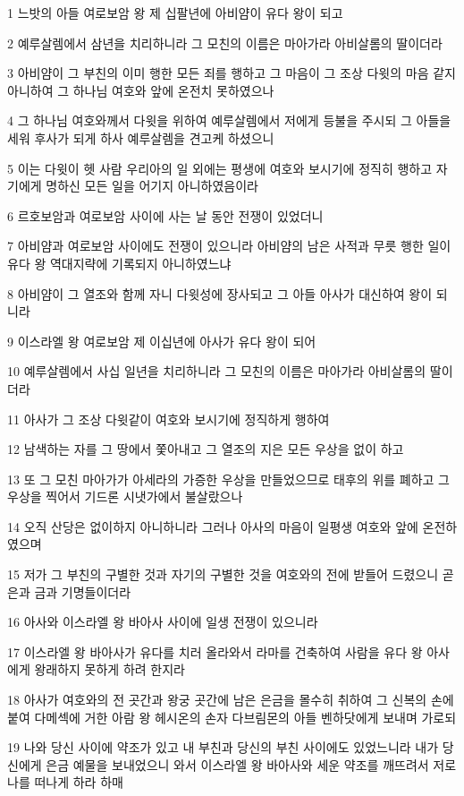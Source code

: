 \par 1 느밧의 아들 여로보암 왕 제 십팔년에 아비얌이 유다 왕이 되고
\par 2 예루살렘에서 삼년을 치리하니라 그 모친의 이름은 마아가라 아비살롬의 딸이더라
\par 3 아비얌이 그 부친의 이미 행한 모든 죄를 행하고 그 마음이 그 조상 다윗의 마음 같지 아니하여 그 하나님 여호와 앞에 온전치 못하였으나
\par 4 그 하나님 여호와께서 다윗을 위하여 예루살렘에서 저에게 등불을 주시되 그 아들을 세워 후사가 되게 하사 예루살렘을 견고케 하셨으니
\par 5 이는 다윗이 헷 사람 우리아의 일 외에는 평생에 여호와 보시기에 정직히 행하고 자기에게 명하신 모든 일을 어기지 아니하였음이라
\par 6 르호보암과 여로보암 사이에 사는 날 동안 전쟁이 있었더니
\par 7 아비얌과 여로보암 사이에도 전쟁이 있으니라 아비얌의 남은 사적과 무릇 행한 일이 유다 왕 역대지략에 기록되지 아니하였느냐
\par 8 아비얌이 그 열조와 함께 자니 다윗성에 장사되고 그 아들 아사가 대신하여 왕이 되니라
\par 9 이스라엘 왕 여로보암 제 이십년에 아사가 유다 왕이 되어
\par 10 예루살렘에서 사십 일년을 치리하니라 그 모친의 이름은 마아가라 아비살롬의 딸이더라
\par 11 아사가 그 조상 다윗같이 여호와 보시기에 정직하게 행하여
\par 12 남색하는 자를 그 땅에서 쫓아내고 그 열조의 지은 모든 우상을 없이 하고
\par 13 또 그 모친 마아가가 아세라의 가증한 우상을 만들었으므로 태후의 위를 폐하고 그 우상을 찍어서 기드론 시냇가에서 불살랐으나
\par 14 오직 산당은 없이하지 아니하니라 그러나 아사의 마음이 일평생 여호와 앞에 온전하였으며
\par 15 저가 그 부친의 구별한 것과 자기의 구별한 것을 여호와의 전에 받들어 드렸으니 곧 은과 금과 기명들이더라
\par 16 아사와 이스라엘 왕 바아사 사이에 일생 전쟁이 있으니라
\par 17 이스라엘 왕 바아사가 유다를 치러 올라와서 라마를 건축하여 사람을 유다 왕 아사에게 왕래하지 못하게 하려 한지라
\par 18 아사가 여호와의 전 곳간과 왕궁 곳간에 남은 은금을 몰수히 취하여 그 신복의 손에 붙여 다메섹에 거한 아람 왕 헤시온의 손자 다브림몬의 아들 벤하닷에게 보내며 가로되
\par 19 나와 당신 사이에 약조가 있고 내 부친과 당신의 부친 사이에도 있었느니라 내가 당신에게 은금 예물을 보내었으니 와서 이스라엘 왕 바아사와 세운 약조를 깨뜨려서 저로 나를 떠나게 하라 하매
